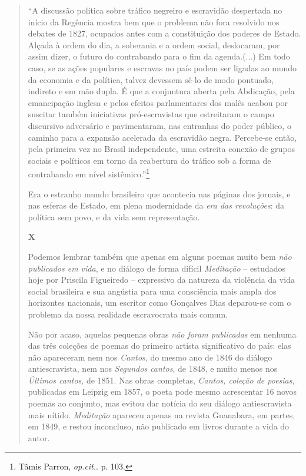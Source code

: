 \begin{quote}
``A discussão política sobre tráfico negreiro e escravidão despertada no
início da Regência mostra bem que o problema não fora resolvido nos
debates de 1827, ocupados antes com a constituição dos poderes de
Estado. Alçada à ordem do dia, a soberania e a ordem social, deslocaram,
por assim dizer, o futuro do contrabando para o fim da agenda.(...) Em
todo caso, se as ações populares e escravas no país podem ser ligadas ao
mundo da economia e da política, talvez devessem sê-lo de modo pontuado,
indireto e em mão dupla. É que a conjuntura aberta pela Abdicação, pela
emancipação inglesa e pelos efeitos parlamentares dos malês acabou por
suscitar também iniciativas pró-escravistas que estreitaram o campo
discursivo adversário e pavimentaram, nas entranhas do poder público, o
caminho para a expansão acelerada da escravidão negra. Percebe-se então,
pela primeira vez no Brasil independente, uma estreita conexão de grupos
sociais e políticos em torno da reabertura do tráfico sob a forma de
contrabando em nível sistêmico.''\footnote{Tâmis Parron, \emph{op.cit.}.
  p. 103.}

Era o estranho mundo brasileiro que acontecia nas páginas dos jornais, e
nas esferas de Estado, em plena modernidade da \emph{era das
revoluções}: da política sem povo, e da vida sem representação.

\textbf{X}

Podemos lembrar também que apenas em alguns poemas muito bem \emph{não
publicados em vida}, e no diálogo de forma difícil \emph{Meditação} --
estudados hoje por Priscila Figueiredo -- expressivo da natureza da
violência da vida social brasileira e sua angústia para uma consciência
mais ampla dos horizontes nacionais, um escritor como Gonçalves Dias
deparou-se com o problema da nossa realidade escravocrata mais comum.

Não por acaso, aquelas pequenas obras \emph{não foram publicadas} em
nenhuma das três coleções de poemas do primeiro artista significativo do
país: elas não apareceram nem nos \emph{Cantos}, do mesmo ano de 1846 do
diálogo antiescravista, nem nos \emph{Segundos cantos}, de 1848, e muito
menos nos \emph{Últimos cantos}, de 1851. Nas obras completas,
\emph{Cantos, coleção de poesias}, publicadas em Leipzig em 1857, o
poeta pode mesmo acrescentar 16 novos poemas ao conjunto, mas evitou dar
notícia do seu diálogo antiescravista mais nítido. \emph{Meditação}
apareceu apenas na revista Guanabara, em partes, em 1849, e restou
inconcluso, não publicado em livros durante a vida do autor.


\end{quote}
